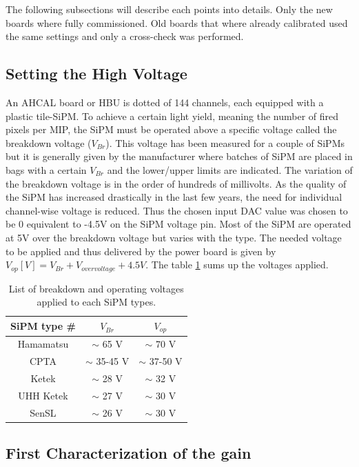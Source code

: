 The following subsections will describe each points into details. Only the new boards where fully commissioned. Old boards that where already calibrated used the same settings and only a cross-check was performed.

\subsection{Setting the High Voltage}

An AHCAL board or HBU is dotted of 144 channels, each equipped with a plastic tile-SiPM. To achieve a certain light yield, meaning the number of fired pixels per MIP, the SiPM must be operated above a specific voltage called the breakdown voltage ($V_{Br}$). This voltage has been measured for a couple of SiPMs but it is generally given by the manufacturer where batches of SiPM are placed in bags with a certain $V_{Br}$ and the lower/upper limits are indicated. The variation of the breakdown voltage is in the order of hundreds of millivolts. As the quality of the SiPM has increased drastically in the last few years, the need for individual channel-wise voltage is reduced. Thus the chosen input DAC value was chosen to be 0 equivalent to -4.5V on the SiPM voltage pin. Most of the SiPM are operated at 5V over the breakdown voltage but varies with the type. The needed voltage to be applied and thus delivered by the power board is given by $V_{op} [V] = V_{Br} + V_{overvoltage} + 4.5V$. The table \ref{table:Voltage_SiPM} sums up the voltages applied.

\begin{table}[htb!]
  \centering
  \caption{List of breakdown and operating voltages applied to each SiPM types.}
  \label{table:Voltage_SiPM}
  \begin{tabular}{@{} ccc @{}}
    \hline
    SiPM type \# & $V_{Br}$ & $V_{op}$ \\
    \hline
    Hamamatsu & $\sim$ 65 V & $\sim$ 70 V \\
    CPTA & $\sim$ 35-45 V & $\sim$ 37-50 V \\
    Ketek & $\sim$ 28 V & $\sim$ 32 V \\
    UHH Ketek & $\sim$ 27 V & $\sim$ 30 V \\
    SenSL & $\sim$ 26 V & $\sim$ 30 V \\
    \hline
  \end{tabular}
\end{table}

\subsection{First Characterization of the gain}

